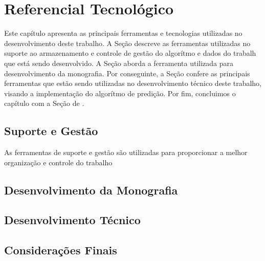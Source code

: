 \chapter[Referencial Tecnológico]{Referencial Tecnológico}

Este capítulo apresenta as principais ferramentas e tecnologias utilizadas no desenvolvimento deste trabalho. A Seção  descreve as ferramentas utilizadas no suporte ao armazenamento e controle de gestão do algorítmo e dados do trabalh que está sendo desenvolvido. A Seção  aborda a ferramenta utilizada para desenvolvimento da monografia. Por conseguinte, a Seção  confere as principais ferramentas que estão sendo utilizadas no desenvolvimento técnico deste trabalho, visando a implementação do algorítmo de predição. Por fim, concluimos o capítulo com a Seção de .

\section{Suporte e Gestão}
\label{suporte}

As ferramentas de suporte e gestão são utilizadas para proporcionar a melhor organização e controle do trabalho

\section{Desenvolvimento da Monografia}
\label{devel_mono}

\section{Desenvolvimento Técnico}
\label{devel_tec}

\section{Considerações Finais}
\label{consid_final}
